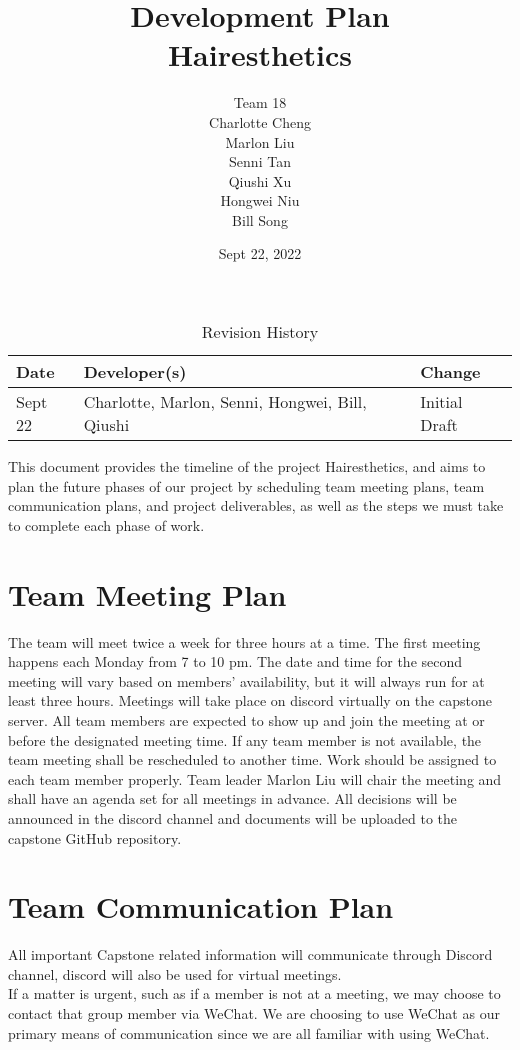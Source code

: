 \documentclass{article}
\title{Development Plan\\Hairesthetics}
\author{Team 18 \\ Charlotte Cheng
        \\ Marlon Liu
        \\ Senni Tan
        \\ Qiushi Xu
        \\ Hongwei Niu
        \\ Bill Song
}
\date{Sept 22, 2022}
\begin{document}
\maketitle

\begin{table}[hp]
\caption{Revision History} \label{TblRevisionHistory}
\begin{tabularx}{\textwidth}{llX}
\toprule
\textbf{Date} & \textbf{Developer(s)} & \textbf{Change}\\
\midrule
Sept 22 & Charlotte, Marlon, Senni, Hongwei, Bill, Qiushi & Initial Draft\\
\bottomrule
\end{tabularx}
\end{table}

\newpage

\maketitle
This document provides the timeline of the project Hairesthetics, and aims to plan the future phases of our project by scheduling team meeting plans, team communication plans, and project deliverables, as well as the steps we must take to complete each phase of work.

\section{Team Meeting Plan}
The team will meet twice a week for three hours at a time. The first meeting happens each Monday from 7 to 10 pm. The date and time for the second meeting will vary based on members' availability, but it will always run for at least three hours.
Meetings will take place on discord virtually on the capstone server. All team members are expected to show up and join the meeting at or before the designated meeting time. If any team member is not available, the team meeting shall be rescheduled to another time. Work should be assigned to each team member properly. Team leader Marlon Liu will chair the meeting and shall have an agenda set for all meetings in advance. All decisions will be announced in the discord channel and documents will be uploaded to the capstone GitHub repository.

\section{Team Communication Plan}
All important Capstone related information will communicate through Discord channel, discord will also be used for virtual meetings. 
\\ If a matter is urgent, such as if a member is not at a meeting, we may choose to contact that group member via WeChat. We are choosing to use WeChat as our primary means of communication since we are all familiar with using WeChat.
\end{document}
